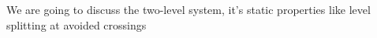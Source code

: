 We are going to discuss the two-level system, it's static properties like level splitting at avoided crossings